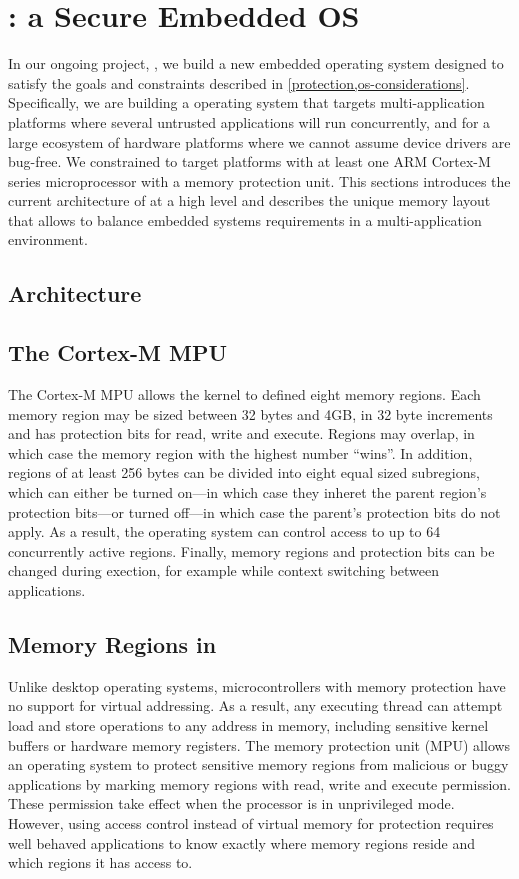 \section{\name: a Secure Embedded OS}

In our ongoing project, \name, we build a new embedded operating system designed
to satisfy the goals and constraints described in \cref{protection,os-considerations}.
Specifically, we are building a operating system
that targets multi-application platforms where several untrusted applications
will run concurrently, and for a large ecosystem of hardware platforms where we
cannot assume device drivers are bug-free. We constrained \name to target
platforms with at least one ARM Cortex-M series microprocessor with a memory
protection unit. This sections introduces the current architecture of \name at a
high level and describes the unique memory layout that allows \name to balance
embedded systems requirements in a multi-application environment.

\subsection{Architecture}

\subsection{The Cortex-M MPU}

The Cortex-M MPU allows the kernel to defined eight memory regions. Each memory
region may be sized between 32 bytes and 4GB, in 32 byte increments and has
protection bits for read, write and execute. Regions may overlap, in which case
the memory region with the highest number ``wins''. In addition, regions of at
least 256 bytes can be divided into eight equal sized subregions, which can
either be turned on---in which case they inheret the parent region's protection
bits---or turned off---in which case the parent's protection bits do not apply.
As a result, the operating system can control access to up to 64 concurrently
active regions. Finally, memory regions and protection bits can be changed
during exection, for example while context switching between applications.

\subsection{Memory Regions in \name}

Unlike desktop operating systems, microcontrollers with memory protection have
no support for virtual addressing. As a result, any executing thread can attempt
load and store operations to any address in memory, including sensitive kernel
buffers or hardware memory registers. The memory protection unit (MPU) allows an
operating system to protect sensitive memory regions from malicious or buggy
applications by marking memory regions with read, write and execute permission.
These permission take effect when the processor is in unprivileged mode.
However, using access control instead of virtual memory for protection requires
well behaved applications to know exactly where memory regions reside and which
regions it has access to.

